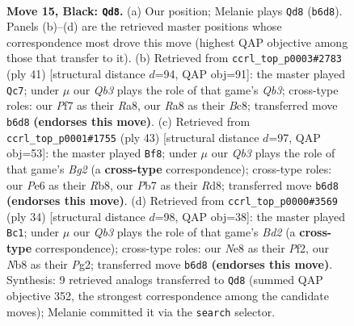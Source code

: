 \documentclass[11pt]{article}
\begin{document}
\clearpage

\begin{figure}[p]\centering
\begin{subfigure}{0.46\textwidth}\centering
\resizebox{\linewidth}{!}{%
\newchessgame
\chessboard[
  setfen={rnb1nrk1/1p2bppp/1q2p3/p3P2P/P1PN1P2/6P1/6B1/RNBQ1RK1 b - - 0 15},
  showmover=false,
  pgfstyle=straightmove, color=movearrow, markmove={b6-d8}
]}
\caption{}
\end{subfigure}\hfill
\begin{subfigure}{0.46\textwidth}\centering
\resizebox{\linewidth}{!}{%
\newchessgame
\chessboard[
  setfen={r1b3k1/1p1nbrp1/1q1p3p/3Ppp2/pBP5/4P1PN/PQ3PBP/1R1R3K b - - 0 21},
  showmover=false,
  pgfstyle=straightmove, color=movearrow, markmove={b6-c7}
]}
\caption{}
\end{subfigure}
\\[4pt]
\begin{subfigure}{0.46\textwidth}\centering
\resizebox{\linewidth}{!}{%
\newchessgame
\chessboard[
  setfen={1r1r2k1/1ppqnpbp/p5p1/4P3/PPbN1P2/6P1/1R3BBP/3QR1K1 b - - 2 22},
  showmover=false,
  pgfstyle=straightmove, color=movearrow, markmove={g7-f8}
]}
\caption{}
\end{subfigure}\hfill
\begin{subfigure}{0.46\textwidth}\centering
\resizebox{\linewidth}{!}{%
\newchessgame
\chessboard[
  setfen={r2qr1k1/1p3p1p/3p2pb/p7/Pn1pPNP1/1Q1P4/1P1B1PP1/R4RK1 w - - 1 18},
  showmover=false,
  pgfstyle=straightmove, color=movearrow, markmove={d2-c1}
]}
\caption{}
\end{subfigure}
\caption{\textbf{Move 15, Black: \texttt{Qd8}.} (a) Our position; Melanie plays \texttt{Qd8} (\texttt{b6d8}). Panels (b)--(d) are the retrieved master positions whose correspondence most drove this move (highest QAP objective among those that transfer to it). (b) Retrieved from \texttt{ccrl\_top\_p0003\#2783} (ply 41) [structural distance $d$=94, QAP obj=91]: the master played \texttt{Qc7}; under $\mu$ our \emph{Qb3} plays the role of that game's \emph{Qb3}; cross-type roles: our \emph{P}f7 as their \emph{R}a8, our \emph{R}a8 as their \emph{B}c8; transferred move \texttt{b6d8} \textbf{(endorses this move)}. (c) Retrieved from \texttt{ccrl\_top\_p0001\#1755} (ply 43) [structural distance $d$=97, QAP obj=53]: the master played \texttt{Bf8}; under $\mu$ our \emph{Qb3} plays the role of that game's \emph{Bg2} (a \textbf{cross-type} correspondence); cross-type roles: our \emph{P}e6 as their \emph{R}b8, our \emph{P}b7 as their \emph{R}d8; transferred move \texttt{b6d8} \textbf{(endorses this move)}. (d) Retrieved from \texttt{ccrl\_top\_p0000\#3569} (ply 34) [structural distance $d$=98, QAP obj=38]: the master played \texttt{Bc1}; under $\mu$ our \emph{Qb3} plays the role of that game's \emph{Bd2} (a \textbf{cross-type} correspondence); cross-type roles: our \emph{N}e8 as their \emph{P}f2, our \emph{N}b8 as their \emph{P}g2; transferred move \texttt{b6d8} \textbf{(endorses this move)}. Synthesis: 9 retrieved analogs transferred to \texttt{Qd8} (summed QAP objective 352, the strongest correspondence among the candidate moves); Melanie committed it via the \texttt{search} selector.}
\label{fig:thought-m29}
\end{figure}
\end{document}
